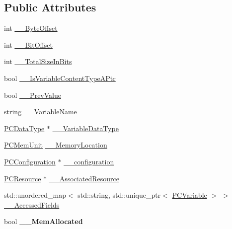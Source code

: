 \subsection*{Public Attributes}
\begin{DoxyCompactItemize}
\item 
int \hyperlink{classpc__emulator_1_1PCVariable_a8297ed459b779cf1c77df8112b88bf87}{\+\_\+\+\_\+\+Byte\+Offset}
\item 
int \hyperlink{classpc__emulator_1_1PCVariable_aefb556613afb059e574d3fb51db650c9}{\+\_\+\+\_\+\+Bit\+Offset}
\item 
int \hyperlink{classpc__emulator_1_1PCVariable_a2e4857bfe8626d81a15ac688077e6551}{\+\_\+\+\_\+\+Total\+Size\+In\+Bits}
\item 
bool \hyperlink{classpc__emulator_1_1PCVariable_a3b2e04044a660a8f58ca660e5db60ae3}{\+\_\+\+\_\+\+Is\+Variable\+Content\+Type\+A\+Ptr}
\item 
bool \hyperlink{classpc__emulator_1_1PCVariable_ac3f4b918f17b9d2ee70d1a4aee8c3305}{\+\_\+\+\_\+\+Prev\+Value}
\item 
string \hyperlink{classpc__emulator_1_1PCVariable_a5cd9e5aa5449218af75e5457ca7fe791}{\+\_\+\+\_\+\+Variable\+Name}
\item 
\hyperlink{classpc__emulator_1_1PCDataType}{P\+C\+Data\+Type} $\ast$ \hyperlink{classpc__emulator_1_1PCVariable_aa54a7c7f6806d301641e61f13453f555}{\+\_\+\+\_\+\+Variable\+Data\+Type}
\item 
\hyperlink{classpc__emulator_1_1PCMemUnit}{P\+C\+Mem\+Unit} \hyperlink{classpc__emulator_1_1PCVariable_a24b16f945f808dada7e6633877a749c1}{\+\_\+\+\_\+\+Memory\+Location}
\item 
\hyperlink{classpc__emulator_1_1PCConfiguration}{P\+C\+Configuration} $\ast$ \hyperlink{classpc__emulator_1_1PCVariable_a83612d987fb797fc979e0c232076c675}{\+\_\+\+\_\+configuration}
\item 
\hyperlink{classpc__emulator_1_1PCResource}{P\+C\+Resource} $\ast$ \hyperlink{classpc__emulator_1_1PCVariable_aee0f12f8e7ef8f3a53953823f8a28d22}{\+\_\+\+\_\+\+Associated\+Resource}
\item 
std\+::unordered\+\_\+map$<$ std\+::string, std\+::unique\+\_\+ptr$<$ \hyperlink{classpc__emulator_1_1PCVariable}{P\+C\+Variable} $>$ $>$ \hyperlink{classpc__emulator_1_1PCVariable_a54c91836070f95a12e0cc1e25d683f88}{\+\_\+\+\_\+\+Accessed\+Fields}
\item 
bool {\bfseries \+\_\+\+\_\+\+Mem\+Allocated}\hypertarget{classpc__emulator_1_1PCVariable_aaad6a898da306863c48d8843644c352d}{}\label{classpc__emulator_1_1PCVariable_aaad6a898da306863c48d8843644c352d}


\end{DoxyCompactItemize}
